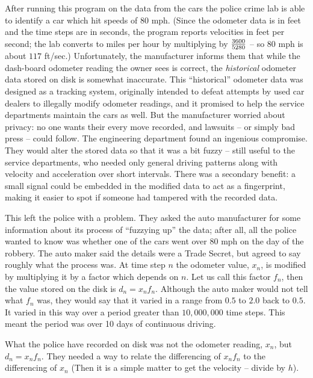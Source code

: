 After running this program on the data from the cars the police crime lab is
able to identify
a car which hit speeds of $80$ mph. (Since the odometer data is in feet and
the time steps are in seconds, the program reports velocities in feet per
second; the lab converts to miles per hour by multiplying by ${3600 \over 5280}$
-- so $80$ mph is about $117$ ft/sec.) Unfortunately, the manufacturer informs them
that while the dash-board odometer reading the owner sees is correct, 
the {\it historical\/} odometer data stored on disk is somewhat inaccurate.
This ``historical'' odometer data was designed as a tracking system,
originally intended to defeat attempts by used car dealers to illegally
modify odometer readings, and it promised to help the service departments
maintain the cars as well. But the manufacturer worried about privacy:
no one wants their every move recorded, and lawsuits -- or simply bad
press -- could follow. The engineering department found an ingenious
compromise. They would alter the stored data so that it was a bit fuzzy --
still useful to the service departments, who needed only general driving
patterns along with velocity and acceleration over short intervals. There
was a secondary benefit: a small signal could be embedded in the modified
data to act as a fingerprint, making it easier to spot if someone had
tampered with the recorded data.

This left the police with a problem. They asked the auto manufacturer for
some information about its process of ``fuzzying up'' the data; after all,
all the police wanted to know was whether one of the cars went over $80$
mph on the day of the robbery. The auto maker said the details were a
Trade Secret, but agreed to say roughly what the process was. At time step $n$ the 
odometer value, $x_n$, is modified by multiplying it by a factor which depends 
on $n$. Let us call this factor $f_n$, then the value stored on 
the disk is $d_n = x_n f_n$. Although the auto maker would not 
tell what $f_n$ 
was, they would say that it varied in a range from  
$0.5$ to $2.0$ back to $0.5$. It varied in this way over a period greater 
than $10,000,000$ time steps. This meant the period was over 10 days 
of continuous driving. 

What the police have recorded on disk was not the odometer reading, $x_n$, 
but $d_n = x_n f_n$. They needed a way to relate the differencing of 
$x_n f_n$ to the differencing of $x_n$ (Then it is a simple matter to 
get the velocity -- divide by $h$). 

